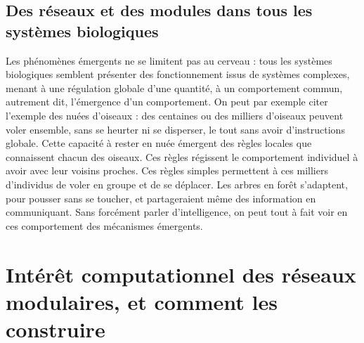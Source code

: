  
%
%
%
%

\subsection{Des réseaux et des modules dans tous les systèmes biologiques}

Les phénomènes émergents ne se limitent pas au cerveau : tous les systèmes biologiques semblent présenter des fonctionnement issus de systèmes complexes, menant à une régulation globale d'une quantité, à un comportement commun, autrement dit, l'émergence d'un comportement. On peut par exemple citer l'exemple des nuées d'oiseaux : des centaines ou des milliers d'oiseaux peuvent voler ensemble, sans se heurter ni se disperser, le tout sans avoir d'instructions globale. Cette capacité à rester en nuée émergent des règles locales que connaissent chacun des oiseaux. Ces règles régissent le comportement individuel à avoir avec leur voisins proches. Ces règles simples permettent à ces milliers d'individus de voler en groupe et de se déplacer.
Les arbres en forêt s'adaptent, pour pousser sans se toucher, et partageraient même des information en communiquant. Sans forcément parler d'intelligence, on peut tout à fait voir en ces comportement des mécanismes émergents.



\section{Intérêt computationnel des réseaux modulaires, et comment les construire}


